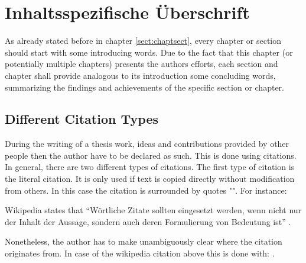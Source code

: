 
\chapter{Inhaltsspezifische Überschrift}
\label{sect:corechapter}


As already stated before in chapter \ref{sect:chaptsect}, every chapter or section should start with some introducing words.
Due to the fact that this chapter (or potentially multiple chapters) presents the authors efforts, each section and chapter shall provide analogous to its introduction some concluding words, summarizing the findings and achievements of the specific section or chapter.


\section{Different Citation Types}

During the writing of a thesis work, ideas and contributions provided by other people then the author have to be declared as such.
This is done using citations.
In general, there are two different types of citations.
The first type of citation is the literal citation.
It is only used if text is copied directly without modification from others.
In this case the citation is surrounded by quotes "".
For instance:
\begin{center}
Wikipedia states that \enquote{Wörtliche Zitate sollten eingesetzt werden, wenn nicht nur der Inhalt der Aussage, sondern auch deren Formulierung von Bedeutung ist} \cite{wikicite}.
\end{center}
Nonetheless, the author has to make unambiguously clear where the citation originates from.
In case of the wikipedia citation above this is done with: \cite{wikicite}.


